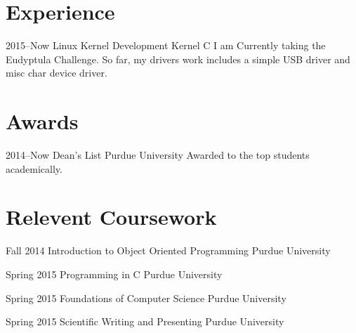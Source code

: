 \documentclass[]{friggeri-cv} %
\begin{document}

\section{Experience}

\begin{entrylist}

\entry
{2015--Now}
{Linux Kernel Development}
{Kernel C}
{I am Currently taking the Eudyptula Challenge. So far, my drivers work includes a simple USB driver and misc char device driver.}

\end{entrylist}

\section{Awards}

\begin{entrylist}


\entry
{2014--Now}
{Dean's List}
{Purdue University}
{Awarded to the top students academically.}


\end{entrylist}


\section{Relevent Coursework}

\begin{entrylist}


\entry
{Fall 2014}
{Introduction to Object Oriented Programming}
{Purdue University}


\entry
{Spring 2015}
{Programming in C}
{Purdue University}


\entry
{Spring 2015}
{Foundations of Computer Science}
{Purdue University}


\entry
{Spring 2015}
{Scientific Writing and Presenting}
{Purdue University}


\end{entrylist}
\end{document}
